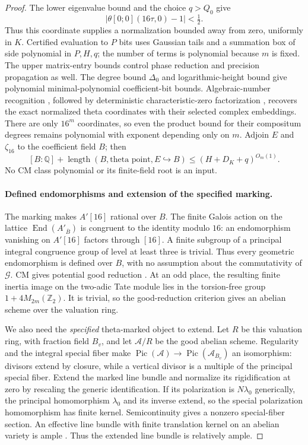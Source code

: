 \documentclass[11pt]{article}
\theoremstyle{definition}
\theoremstyle{remark}
\begin{document}
\begin{proof}
The lower eigenvalue bound and the choice $q>Q_0$ give
\[
 |\theta[0;0](16\tau,0)-1|<\tfrac12.
\]
Thus this coordinate supplies a normalization bounded away from zero,
uniformly in $K$.  Certified evaluation to $P$ bits uses Gaussian tails
and a summation box of side polynomial in $P,H,q$; the number of terms is
polynomial because $m$ is fixed.  The upper matrix-entry bounds control
phase reduction and precision propagation as well.
The degree bound $\Delta_0$ and logarithmic-height bound give polynomial
minimal-polynomial coefficient-bit bounds.  Algebraic-number recognition
\cite[Theorem~1.19, p.~241; Proposition~1.6, p.~238]{KannanLenstraLovasz1988},
followed by deterministic characteristic-zero factorization
\cite[Theorem~4.5, pp.~253--254]{Lenstra1983}, recovers the exact normalized
theta coordinates with their selected complex embeddings.
There are only $16^m$ coordinates, so even the product bound for their
compositum degrees remains polynomial with exponent depending only on $m$.
Adjoin $E$ and $\zeta_{16}$ to the coefficient field $B$; then
\[
 [B:\mathbb Q]+\operatorname{length}(B,\text{theta point},E\hookrightarrow B)
       \leq(H+D_K+q)^{O_m(1)}.
\]
No CM class polynomial or its finite-field root is an input.

\paragraph{Defined endomorphisms and extension of the specified marking.}
The marking makes $A'[16]$ rational over $B$.  The finite Galois action on
the lattice $\operatorname{End}(A'_{\overline B})$ is congruent to the identity
modulo $16$: an endomorphism vanishing on $A'[16]$ factors through $[16]$.
A finite subgroup of a principal integral congruence group of level at
least three is trivial.  Thus every geometric endomorphism is defined over
$B$, with no assumption about the commutativity of $\mathcal G$.
CM gives potential good reduction \citep[Theorem~6(a), p.~503]{SerreTate1968}.  At an odd place,
the resulting finite inertia image on the two-adic Tate module lies in the
torsion-free group $1+4M_{2m}(\mathbb Z_2)$.  It is trivial, so the
good-reduction criterion gives an abelian scheme over the valuation ring.

We also need the \emph{specified} theta-marked object to extend.
Let $R$ be this valuation ring, with fraction field $B_v$, and let
$\mathcal A/R$ be the good abelian scheme.  Regularity and the integral
special fiber make $\operatorname{Pic}(\mathcal A)\to
\operatorname{Pic}(\mathcal A_{B_v})$ an isomorphism: divisors extend by
closure, while a vertical divisor is a multiple of the principal special
fiber.  Extend the marked line bundle and normalize its rigidification at
zero by rescaling the generic identification.  If its polarization is
$N\lambda_0$ generically, the principal homomorphism $\lambda_0$ and its
inverse extend, so the special polarization homomorphism has finite kernel.
Semicontinuity gives a nonzero special-fiber section.  An effective line
bundle with finite translation kernel on an abelian variety is ample
\cite[Chapter II, Section 6, Application 1, pp.~60--61]{MumfordAV1970}.
Thus the extended line bundle is relatively ample.


\end{proof}
\end{document}
